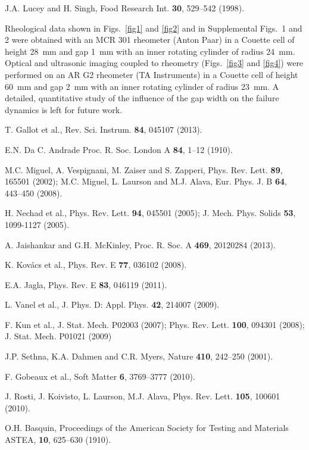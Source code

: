 \documentclass[twocolumn,superscriptaddress,showpacs,preprintnumbers,amsmath,amssymb,prl]{revtex4}
\begin{document}
\begin{thebibliography}{}
 J.A. Lucey and H. Singh, Food Research Int. {\bf 30}, 529--542 (1998).

 Rheological data shown in Figs.~\ref{fig1} and \ref{fig2} and in Supplemental Figs.~1 and 2 were obtained with an MCR 301 rheometer (Anton Paar) in a Couette cell of height 28~mm and gap 1~mm with an inner rotating cylinder of radius 24~mm. Optical and ultrasonic imaging coupled to rheometry (Figs.~\ref{fig3} and \ref{fig4}) were performed on an AR G2 rheometer (TA Instruments) in a Couette cell of height 60~mm and gap 2~mm with an inner rotating cylinder of radius 23~mm. A detailed, quantitative study of the influence of the gap width on the failure dynamics is left for future work.

 T. Gallot et al., Rev. Sci. Instrum. {\bf 84}, 045107 (2013).

 E.N. Da C. Andrade Proc. R. Soc. London A {\bf 84}, 1--12 (1910).

 M.C. Miguel, A. Vespignani, M. Zaiser and S. Zapperi, Phys. Rev. Lett. {\bf 89}, 165501 (2002); M.C. Miguel, L. Laurson and M.J. Alava, Eur. Phys. J. B {\bf 64}, 443--450 (2008).

 H. Nechad et al., Phys. Rev. Lett. {\bf 94}, 045501 (2005); J. Mech. Phys. Solids {\bf 53}, 1099-1127 (2005).

 A. Jaishankar and G.H. McKinley, Proc. R. Soc. A {\bf 469}, 20120284 (2013).

 K. Kov\'acs et al., Phys. Rev. E \textbf{77}, 036102 (2008).

 E.A. Jagla, Phys. Rev. E {\bf 83}, 046119 (2011).

 L. Vanel et al., J. Phys. D: Appl. Phys. {\bf 42}, 214007 (2009).

 F. Kun et al., J. Stat. Mech. P02003 (2007); Phys. Rev. Lett. {\bf 100}, 094301 (2008); J. Stat. Mech. P01021 (2009)

 J.P. Sethna, K.A. Dahmen and C.R. Myers, Nature {\bf 410}, 242--250 (2001).

 F. Gobeaux et al., Soft Matter {\bf 6}, 3769--3777 (2010).

 J. Rosti, J. Koivisto, L. Laurson, M.J. Alava, Phys. Rev. Lett. {\bf 105}, 100601 (2010).

 O.H. Basquin, Proceedings of the American Society for Testing and Materials ASTEA, {\bf 10}, 625--630 (1910).


\end{thebibliography}
\end{document}
